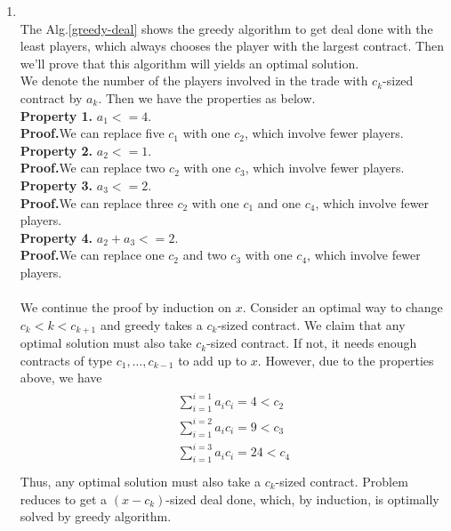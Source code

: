 \documentclass[12pt,a4paper]{article}
\makeatletter
\newtheorem*{solution}{Solution}
\theoremstyle{definition}
\renewenvironment{solution}[1][Solution] {\par\pushQED{\qed}\normalfont\topsep6\p@\@plus6\p@\relax\trivlist\item[\hskip\labelsep\bfseries#1\@addpunct{.}]\ignorespaces}{\popQED\endtrivlist\@endpefalse} \makeatother
\makeatother
\begin{document}
\begin{enumerate}
\begin{solution}
\begin{enumerate}
                ~\\
                The Alg.\ref{greedy-deal} shows the greedy algorithm to get deal done with the least players, which always chooses the player with the largest contract. Then we'll prove that this algorithm will yields an optimal solution.\\
                We denote the number of the players involved in the trade with $c_k$-sized contract by $a_k$. Then we have the properties as below.\\
                \textbf{Property 1.} $a_1<=4$.\\
                \textbf{Proof.}We can replace five $c_1$ with one $c_2$, which involve fewer players.\\
                \textbf{Property 2.} $a_2<=1$.\\
                \textbf{Proof.}We can replace two $c_2$ with one $c_3$, which involve fewer players.\\
                \textbf{Property 3.} $a_3<=2$.\\
                \textbf{Proof.}We can replace three $c_2$ with one $c_1$ and one $c_4$, which involve fewer players.\\
                \textbf{Property 4.} $a_2+a_3<=2$.\\
                \textbf{Proof.}We can replace one $c_2$ and two $c_3$ with one $c_4$, which involve fewer players.\\
                ~\\
                We continue the proof by induction on $x$. Consider an optimal way to change $c_k<k<c_{k+1}$ and greedy takes a $c_k$-sized contract. We claim that any optimal solution must also take $c_k$-sized contract. If not, it needs enough contracts of type $c_1,\dots,c_{k-1}$ to add up to $x$. However, due to the properties above, we have
                \begin{align}
                    \begin{split}
                        \sum_{i=1}^{i=1}a_ic_i = 4<c_2\\
                        \sum_{i=1}^{i=2}a_ic_i = 9<c_3\\
                        \sum_{i=1}^{i=3}a_ic_i = 24<c_4\\
                    \end{split}
                \end{align}
                Thus, any optimal solution must also take a $c_k$-sized contract. Problem reduces to get a $(x-c_k)$-sized deal done, which, by induction, is optimally solved by greedy algorithm.
                

\end{enumerate}
\end{solution}
\end{enumerate}
\end{document}
